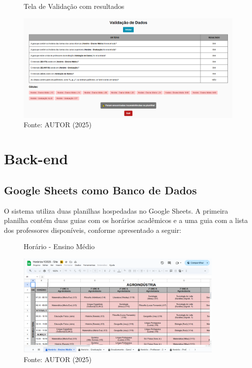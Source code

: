 \begin{itemize}
    \begin{figure}[htb]
        \centering
        \caption{Tela de Validação com resultados}
        \includegraphics[width=1\textwidth]{Figuras/front-22.png}
        \caption*{Fonte: AUTOR (2025)}
        \label{fig_front_22}
    \end{figure}
\end{itemize}

\section{Back-end}

\subsection{Google Sheets como Banco de Dados}

O sistema utiliza duas planilhas hospedadas no Google Sheets. A primeira planilha contém duas guias com os horários acadêmicos e a uma guia com a lista dos professores disponíveis, conforme apresentado a seguir:

\begin{figure}[H]
    \centering
    \caption{Horário - Ensino Médio}
    \includegraphics[width=0.9\textwidth]{Figuras/plan-1.png}
    \caption*{Fonte: AUTOR (2025)}
    \label{fig_plan_1}
\end{figure}

